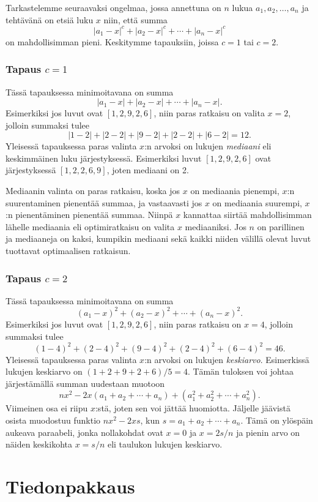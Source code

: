 Tarkastelemme seuraavaksi ongelmaa, jossa
annettuna on $n$ lukua $a_1,a_2,\ldots,a_n$
ja tehtävänä on etsiä luku $x$ niin, että summa
\[|a_1-x|^c+|a_2-x|^c+\cdots+|a_n-x|^c\]
on mahdollisimman pieni.
Keskitymme tapauksiin, joissa $c=1$ tai $c=2$.

\subsubsection{Tapaus $c=1$}

Tässä tapauksessa minimoitavana on summa
\[|a_1-x|+|a_2-x|+\cdots+|a_n-x|.\]
Esimerkiksi jos luvut ovat $[1,2,9,2,6]$,
niin paras ratkaisu on valita $x=2$,
jolloin summaksi tulee
\[
|1-2|+|2-2|+|9-2|+|2-2|+|6-2|=12.
\]
Yleisessä tapauksessa paras valinta $x$:n arvoksi
on lukujen \textit{mediaani}
eli keskimmäinen luku järjestyksessä.
Esimerkiksi luvut $[1,2,9,2,6]$
ovat järjestyksessä $[1,2,2,6,9]$,
joten mediaani on 2.

Mediaanin valinta on paras ratkaisu,
koska jos $x$ on mediaania pienempi,
$x$:n suurentaminen pienentää summaa,
ja vastaavasti jos $x$ on mediaania suurempi,
$x$:n pienentäminen pienentää summaa.
Niinpä $x$ kannattaa siirtää mahdollisimman
lähelle mediaania eli optimiratkaisu on
valita $x$ mediaaniksi.
Jos $n$ on parillinen ja mediaaneja on kaksi,
kumpikin mediaani sekä kaikki niiden välillä
olevat luvut tuottavat optimaalisen ratkaisun.

\subsubsection{Tapaus $c=2$}

Tässä tapauksessa minimoitavana on summa
\[(a_1-x)^2+(a_2-x)^2+\cdots+(a_n-x)^2.\]
Esimerkiksi jos luvut ovat $[1,2,9,2,6]$,
niin paras ratkaisu on $x=4$,
jolloin summaksi tulee
\[
(1-4)^2+(2-4)^2+(9-4)^2+(2-4)^2+(6-4)^2=46.
\]
Yleisessä tapauksessa paras valinta $x$:n arvoksi on lukujen
\textit{keskiarvo}.
Esimerkissä lukujen keskiarvo on $(1+2+9+2+6)/5=4$.
Tämän tuloksen voi johtaa järjestämällä summan
uudestaan muotoon
\[
nx^2 - 2x(a_1+a_2+\cdots+a_n) + (a_1^2+a_2^2+\cdots+a_n^2).
\]
Viimeinen osa ei riipu $x$:stä, joten sen voi jättää huomiotta.
Jäljelle jäävistä osista muodostuu funktio
$nx^2-2xs$, kun $s=a_1+a_2+\cdots+a_n$.
Tämä on ylöspäin aukeava paraabeli,
jonka nollakohdat ovat $x=0$ ja $x=2s/n$
ja pienin arvo on näiden keskikohta
$x=s/n$ eli taulukon lukujen keskiarvo.

\section{Tiedonpakkaus}

